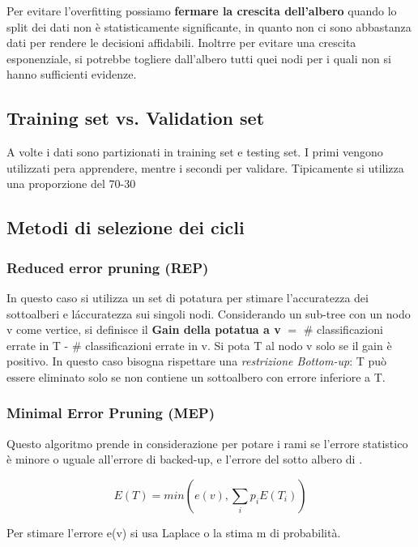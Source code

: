 \documentclass[a4paper]{extarticle}
\begin{document}
Per evitare l'overfitting possiamo \textbf{fermare la crescita dell'albero} quando lo split dei dati non è statisticamente significante, in quanto non ci sono abbastanza dati per rendere le decisioni  affidabili. Inoltrre per evitare una crescita esponenziale, si potrebbe togliere dall'albero tutti quei nodi per i quali non si hanno sufficienti evidenze.

\subsection{Training set vs. Validation set}

A volte i dati sono partizionati in training set e testing set. I primi vengono utilizzati pera apprendere, mentre i secondi per validare. Tipicamente si utilizza una proporzione del 70-30%

\subsection{Metodi di selezione dei cicli}

\subsubsection{Reduced error pruning (REP)}

In questo caso si utilizza un set di potatura per stimare l'accuratezza dei sottoalberi e l\' accuratezza sui singoli nodi. Considerando un sub-tree con un nodo v come vertice, si definisce il \textbf{Gain della potatua a v} $= $ \# classificazioni errate in T - \# classificazioni errate in v. Si pota T al nodo v solo se il gain è positivo. In questo caso bisogna rispettare una \textit{restrizione Bottom-up}: T può essere eliminato solo se non contiene un sottoalbero con errore inferiore a T.

\subsubsection{Minimal Error Pruning (MEP)}

Questo algoritmo prende in considerazione per potare i rami se l'errore statistico è minore o uguale all'errore di backed-up, e l'errore del sotto albero di .

\begin{equation*}
E(T) = min(e(v), \sum\limits_{i} p_iE(T_i))
\end{equation*}

Per stimare l'errore e(v) si usa Laplace o la stima m di probabilità.
\end{document}
